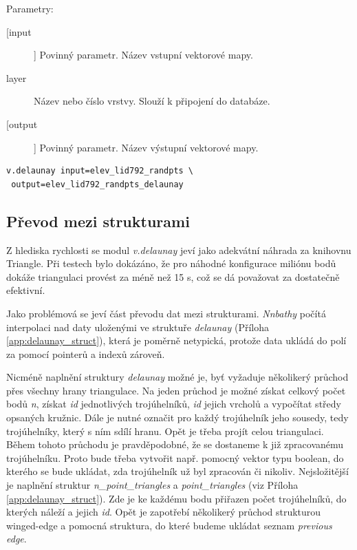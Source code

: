 \documentclass[12pt,a4paper]{article}
\begin{document}
{\noindent Parametry:
\begin{description}
\item[[input]] Povinný parametr. Název vstupní vektorové mapy.
\item[layer] Název nebo číslo vrstvy. Slouží k připojení do databáze.
\item[[output]] Povinný parametr. Název výstupní vektorové mapy.
\end{description}

\begin{lstlisting}[caption={Volání modulu v.delaunay z příkazové řádky}]
v.delaunay input=elev_lid792_randpts \
 output=elev_lid792_randpts_delaunay
\end{lstlisting}

\bigskip
\subsection{Převod mezi strukturami}

Z hlediska rychlosti se modul \emph{v.delaunay} jeví jako adekvátní
náhrada za knihovnu Triangle. Při testech bylo dokázáno, že pro
náhodné konfigurace miliónu bodů dokáže triangulaci provést za méně
než 15 s, což se dá považovat za dostatečně efektivní.

Jako problémová se jeví část převodu dat mezi
strukturami. \emph{Nnbathy} počítá interpolaci nad daty uloženými ve
struktuře \emph{delaunay} (Příloha \ref{app:delaunay_struct}), která
je poměrně netypická, protože data ukládá do polí za pomocí pointerů a
indexů zároveň.

Nicméně naplnění struktury \emph{delaunay} možné je, byť vyžaduje
několikerý průchod přes všechny hrany triangulace. Na jeden průchod je
možné získat celkový počet bodů \emph{n}, získat \emph{id}
jednotlivých trojúhelníků, \emph{id} jejich vrcholů a vypočítat středy
opsaných kružnic. Dále je nutné označit pro každý trojúhelník jeho
sousedy, tedy trojúhelníky, který s ním sdílí hranu. Opět je třeba
projít celou triangulaci. Během tohoto průchodu je pravděpodobné, že
se dostaneme k již zpracovanému trojúhelníku. Proto bude třeba
vytvořit např. pomocný vektor typu boolean, do kterého se bude
ukládat, zda trojúhelník už byl zpracován či nikoliv. Nejsložitější je
naplnění struktur \emph{n\_point\_triangles} a \emph{point\_triangles}
(viz Příloha \ref{app:delaunay_struct}). Zde je ke každému bodu
přiřazen počet trojúhelníků, do kterých náleží a jejich
\emph{id}. Opět je zapotřebí několikerý průchod strukturou winged-edge
a pomocná struktura, do které budeme ukládat seznam \emph{previous
  edge}.

}
\end{document}
